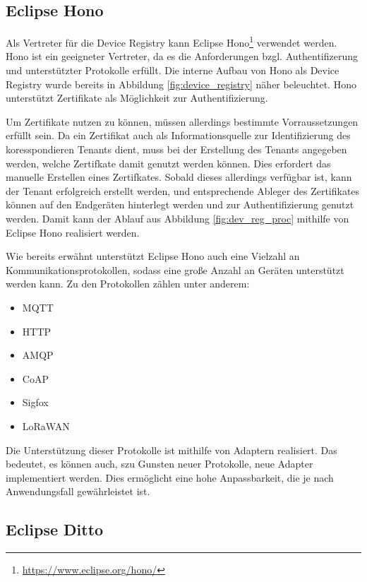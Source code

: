 \subsection{Eclipse Hono}

Als Vertreter für die Device Registry kann Eclipse Hono\footnote{\url{https://www.eclipse.org/hono/}} verwendet werden. Hono ist ein geeigneter Vertreter, da es die Anforderungen bzgl. Authentifizerung und unterstützter Protokolle erfüllt. Die interne Aufbau von Hono als Device Registry wurde bereits in Abbildung \vref{fig:device_registry} näher beleuchtet. Hono unterstützt Zertifikate als Möglichkeit zur Authentifizierung.

Um Zertifikate nutzen zu können, müssen allerdings bestimmte Vorraussetzungen erfüllt sein. Da ein Zertifikat auch als Informationsquelle zur Identifizierung des koresspondieren Tenants dient, muss bei der Erstellung des Tenants angegeben werden, welche Zertifkate damit genutzt werden können. Dies erfordert das manuelle Erstellen eines Zertifkates. Sobald dieses allerdings verfügbar ist, kann der Tenant erfolgreich erstellt werden, und entsprechende Ableger des Zertifikates können auf den Endgeräten hinterlegt werden und zur Authentifizierung genutzt werden. Damit kann der Ablauf aus Abbildung \vref{fig:dev_reg_proc} mithilfe von Eclipse Hono realisiert werden.

Wie bereits erwähnt unterstützt Eclipse Hono auch eine Vielzahl an Kommunikationsprotokollen, sodass eine große Anzahl an Geräten unterstützt werden kann. Zu den Protokollen zählen unter anderem:

\begin{itemize}
    \item MQTT
    \item HTTP
    \item AMQP
    \item CoAP
    \item Sigfox
    \item LoRaWAN
\end{itemize}

Die Unterstützung dieser Protokolle ist mithilfe von Adaptern realisiert. Das bedeutet, es können auch, szu Gunsten neuer Protokolle, neue Adapter implementiert werden. Dies ermöglicht eine hohe Anpassbarkeit, die je nach Anwendungsfall gewährleistet ist.

\subsection{Eclipse Ditto}

